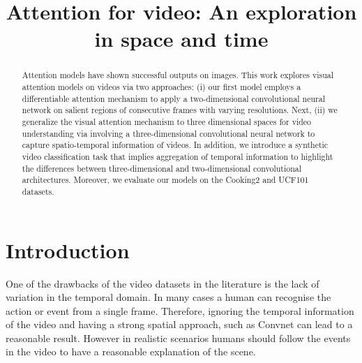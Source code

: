\documentclass{article} %
\title{Attention for video: An exploration in space and time}
\begin{document}
\maketitle

\begin{abstract}
Attention models have shown successful outputs on images. This work explores visual attention models on videos via two approaches: (i) our first model employs a differentiable attention mechanism to apply a two-dimensional convolutional neural network on salient regions of consecutive frames with varying resolutions.
Next, (ii) we generalize the visual attention mechanism to three dimensional spaces for video understanding via involving a three-dimensional convolutional neural network to capture spatio-temporal information of videos.
In addition, we introduce a synthetic video classification task that implies aggregation of temporal information to highlight the differences between three-dimensional and two-dimensional convolutional architectures. Moreover, we evaluate our models on the Cooking2 and UCF101 datasets.
\end{abstract}

\section{Introduction}
One of the drawbacks of the video datasets in the literature is the lack of variation in the temporal domain. In many cases a human can recognise the action or event from a single frame. Therefore, ignoring the temporal information of the video and having a strong spatial approach, such as Convnet can lead to a reasonable result. However in realistic scenarios humans should follow the events in the video to have a reasonable explanation of the scene. 
\end{document}
